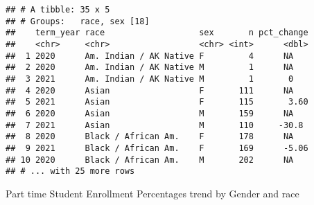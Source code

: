 \documentclass[]{article}
\newenvironment{Shaded}{\begin{snugshade}}{\end{snugshade}}
\newcommand{\CommentTok}[1]{\textcolor[rgb]{0.56,0.35,0.01}{\textit{#1}}}
\newcommand{\DataTypeTok}[1]{\textcolor[rgb]{0.13,0.29,0.53}{#1}}
\newcommand{\DecValTok}[1]{\textcolor[rgb]{0.00,0.00,0.81}{#1}}
\newcommand{\KeywordTok}[1]{\textcolor[rgb]{0.13,0.29,0.53}{\textbf{#1}}}
\newcommand{\NormalTok}[1]{#1}
\newcommand{\OperatorTok}[1]{\textcolor[rgb]{0.81,0.36,0.00}{\textbf{#1}}}
\newcommand{\OtherTok}[1]{\textcolor[rgb]{0.56,0.35,0.01}{#1}}
\newcommand{\StringTok}[1]{\textcolor[rgb]{0.31,0.60,0.02}{#1}}
\begin{document}
\begin{Shaded}
\end{Shaded}

\begin{verbatim}
## # A tibble: 35 x 5
## # Groups:   race, sex [18]
##    term_year race                   sex       n pct_change
##    <chr>     <chr>                  <chr> <int>      <dbl>
##  1 2020      Am. Indian / AK Native F         4      NA   
##  2 2020      Am. Indian / AK Native M         1      NA   
##  3 2021      Am. Indian / AK Native M         1       0   
##  4 2020      Asian                  F       111      NA   
##  5 2021      Asian                  F       115       3.60
##  6 2020      Asian                  M       159      NA   
##  7 2021      Asian                  M       110     -30.8 
##  8 2020      Black / African Am.    F       178      NA   
##  9 2021      Black / African Am.    F       169      -5.06
## 10 2020      Black / African Am.    M       202      NA   
## # ... with 25 more rows
\end{verbatim}

Part time Student Enrollment Percentages trend by Gender and race
\end{document}
